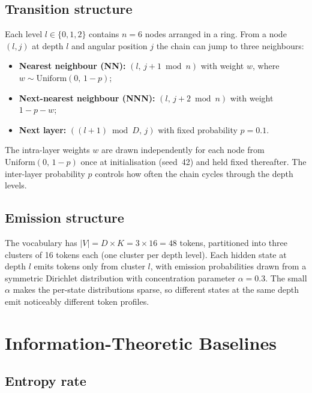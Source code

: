 \documentclass[11pt]{article}
\begin{document}
\subsection{Transition structure}

Each level $l \in \{0, 1, 2\}$ contains $n = 6$ nodes arranged in a
ring.  From a node $(l, j)$ at depth $l$ and angular position $j$ the
chain can jump to three neighbours:
\begin{itemize}
  \item \textbf{Nearest neighbour (NN):} $(l,\, j{+}1 \bmod n)$ with
        weight $w$, where $w \sim \mathrm{Uniform}(0,\, 1{-}p)$;
  \item \textbf{Next-nearest neighbour (NNN):} $(l,\, j{+}2 \bmod n)$
        with weight $1 - p - w$;
  \item \textbf{Next layer:} $((l{+}1) \bmod D,\, j)$ with fixed
        probability $p = 0.1$.
\end{itemize}
The intra-layer weights $w$ are drawn independently for each node from
$\mathrm{Uniform}(0,\, 1{-}p)$ once at initialisation (seed~42) and
held fixed thereafter.  The inter-layer probability $p$ controls how
often the chain cycles through the depth levels.


\subsection{Emission structure}

The vocabulary has $|V| = D \times K = 3 \times 16 = 48$ tokens,
partitioned into three clusters of 16 tokens each (one cluster per depth
level).  Each hidden state at depth $l$ emits tokens only from cluster
$l$, with emission probabilities drawn from a symmetric Dirichlet
distribution with concentration parameter $\alpha = 0.3$.  The small
$\alpha$ makes the per-state distributions sparse, so different states
at the same depth emit noticeably different token profiles.

\section{Information-Theoretic Baselines}\label{sec:baselines}

\subsection{Entropy rate}\label{sec:entropy-rate}
\end{document}
